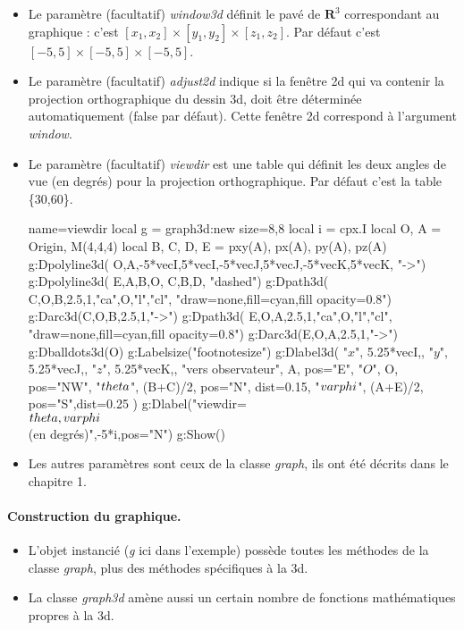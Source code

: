 \begin{itemize}
 \item Le paramètre (facultatif) \emph{window3d} définit le pavé de $\mathbf R^3$ correspondant au graphique : c'est $[x_1,x_2]\times[y_1,y_2]\times[z_1,z_2]$. Par défaut c'est $[-5,5]\times[-5,5]\times[-5,5]$.
 \item Le paramètre (facultatif) \emph{adjust2d} indique si la fenêtre 2d qui va contenir la projection orthographique du dessin 3d, doit être déterminée automatiquement (false par défaut). Cette fenêtre 2d correspond à l'argument \emph{window}.
 
 \item Le paramètre (facultatif) \emph{viewdir} est une table qui définit les deux angles de vue (en degrés) pour la projection orthographique. Par défaut c'est la table \{30,60\}.
 
\begin{center}
\label{viewdir}
\begin{luadraw}{name=viewdir}
local g = graph3d:new{ size={8,8} }
local i = cpx.I
local O, A = Origin, M(4,4,4)
local B, C, D, E = pxy(A), px(A), py(A), pz(A)
g:Dpolyline3d( {{O,A},{-5*vecI,5*vecI},{-5*vecJ,5*vecJ},{-5*vecK,5*vecK}}, "->")
g:Dpolyline3d( {{E,A,B,O}, {C,B,D}}, "dashed")
g:Dpath3d( {C,O,B,2.5,1,"ca",O,"l","cl"}, "draw=none,fill=cyan,fill opacity=0.8")
g:Darc3d(C,O,B,2.5,1,"->")
g:Dpath3d( {E,O,A,2.5,1,"ca",O,"l","cl"}, "draw=none,fill=cyan,fill opacity=0.8")
g:Darc3d(E,O,A,2.5,1,"->")
g:Dballdots3d(O)
g:Labelsize("footnotesize")
g:Dlabel3d(
    "$x$", 5.25*vecI,{}, "$y$", 5.25*vecJ,{}, "$z$", 5.25*vecK,{},
    "vers observateur", A, {pos="E"},
    "$O$", O, {pos="NW"},
    "$\\theta$", (B+C)/2, {pos="N", dist=0.15},
    "$\\varphi$", (A+E)/2, {pos="S",dist=0.25}
)
g:Dlabel("viewdir=\\{$\\theta,\\varphi$\\} (en degrés)",-5*i,{pos="N"})
g:Show()            
\end{luadraw}
\end{center}

\item Les autres paramètres sont ceux de la classe \emph{graph}, ils ont été décrits dans le chapitre 1.
\end{itemize}

\paragraph{Construction du graphique.}

\begin{itemize}
    \item L'objet instancié (\emph{g} ici dans l'exemple) possède toutes les méthodes de la classe \emph{graph}, plus des méthodes spécifiques à la 3d.
    \item La classe \emph{graph3d} amène aussi un certain nombre de fonctions mathématiques propres à la 3d.
\end{itemize}
